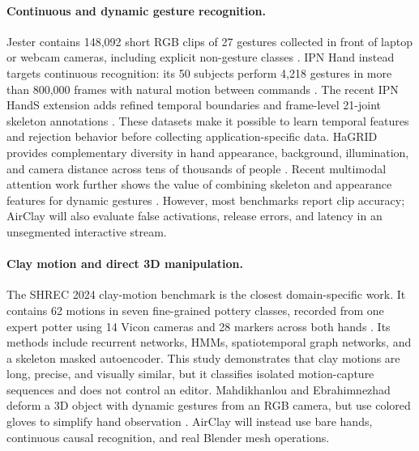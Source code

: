 \documentclass{article}
\begin{document}
\paragraph{Continuous and dynamic gesture recognition.}
Jester contains 148,092 short RGB clips of 27 gestures collected in front of
laptop or webcam cameras, including explicit non-gesture classes
\citep{materzynska2019jester}. IPN Hand instead targets continuous recognition:
its 50 subjects perform 4,218 gestures in more than 800,000 frames with natural
motion between commands \citep{benitez2021ipn}. The recent IPN HandS extension
adds refined temporal boundaries and frame-level 21-joint skeleton annotations
\citep{benitez2025ipnhands}. These datasets make it possible to learn temporal
features and rejection behavior before collecting application-specific data.
HaGRID provides complementary diversity in hand appearance, background,
illumination, and camera distance across tens of thousands of people
\citep{kapitanov2024hagrid}. Recent multimodal attention work further shows the
value of combining skeleton and appearance features for dynamic gestures
\citep{balaji2024multimodal}. However, most benchmarks report clip accuracy;
AirClay will also evaluate false activations, release errors, and latency in an
unsegmented interactive stream.

\paragraph{Clay motion and direct 3D manipulation.}
The SHREC 2024 clay-motion benchmark is the closest domain-specific work. It
contains 62 motions in seven fine-grained pottery classes, recorded from one
expert potter using 14 Vicon cameras and 28 markers across both hands
\citep{veldhuijzen2024shrec}. Its methods include recurrent networks, HMMs,
spatiotemporal graph networks, and a skeleton masked autoencoder. This study
demonstrates that clay motions are long, precise, and visually similar, but it
classifies isolated motion-capture sequences and does not control an editor.
Mahdikhanlou and Ebrahimnezhad deform a 3D object with dynamic gestures from an
RGB camera, but use colored gloves to simplify hand observation
\citep{mahdikhanlou2022deforming}. AirClay will instead use bare hands,
continuous causal recognition, and real Blender mesh operations.
\end{document}
